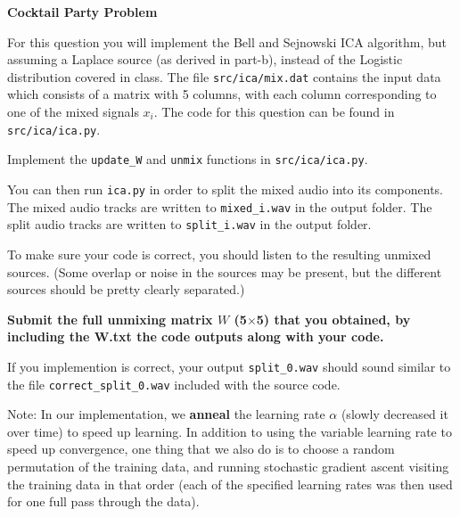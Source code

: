\item {} \textbf{Cocktail Party Problem}

For this question you will implement the Bell and Sejnowski ICA algorithm, but
assuming a Laplace source (as derived in part-b), instead of the Logistic distribution
covered in class. The file \texttt{src/ica/mix.dat} contains the input data which consists of a matrix
with 5 columns, with each column corresponding to one of the mixed signals
$x_i$. The code for this question can be found in \texttt{src/ica/ica.py}.

Implement the \texttt{update\_W} and \texttt{unmix} functions in \texttt{src/ica/ica.py}.

You can then run \texttt{ica.py} in order to split the mixed audio into its components.
The mixed audio tracks are written to \texttt{mixed\_i.wav} in the output folder.
The split audio tracks are written to \texttt{split\_i.wav} in the output folder.

To make sure your code is correct, you should listen to the
resulting unmixed sources.  (Some overlap or noise in the sources may be present,
but the different sources should be pretty clearly separated.)

\textbf{Submit the full unmixing matrix $W$ (5$\times$5) that you obtained, by including the W.txt the code outputs along with your code.}

If you implemention is correct, your output \texttt{split\_0.wav} should sound similar to the file \texttt{correct\_split\_0.wav} included with the source code.

Note: In our implementation, we {\bf anneal} the learning rate $\alpha$
(slowly decreased it over time) to speed up learning. In addition to using the variable
learning rate to speed up convergence, one thing that we also do is to
choose a random permutation of the training data, and running stochastic
gradient ascent visiting the training data in that order (each of the
specified learning rates was then used for one full pass through the data).

